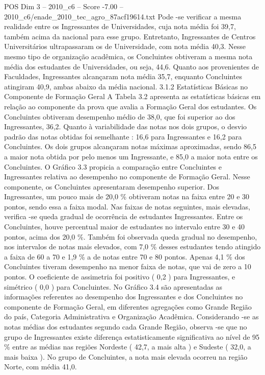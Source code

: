 \begin{textsample}{POS Dim 3 – 2010\_c6 – Score -7.00 – 2010\_c6/enade\_2010\_tec\_agro\_87acf19614.txt}
Pode -se verificar a mesma realidade entre os Ingressantes de Universidades, cuja nota média foi 39,7, também acima da nacional para esse grupo.
Entretanto, Ingressantes de Centros Universitários ultrapassaram os de Universidade, com nota média 40,3.
Nesse mesmo tipo de organização acadêmica, os Concluintes obtiveram a mesma nota média dos estudantes de Universidades, ou seja, 44,6.
Quanto aos provenientes de Faculdades, Ingressantes alcançaram nota média 35,7, enquanto Concluintes atingiram 40,9, ambas abaixo da média nacional. 3.1.2 Estatísticas Básicas no Componente de Formação Geral A Tabela 3.2 apresenta as estatísticas básicas em relação ao componente da prova que avalia a Formação Geral dos estudantes.
Os Concluintes obtiveram desempenho médio de 38,0, que foi superior ao dos Ingressantes, 36,2.
Quanto à variabilidade das notas nos dois grupos, o desvio padrão das notas obtidas foi semelhante : 16,6 para Ingressantes e 16,2 para Concluintes.
Os dois grupos alcançaram notas máximas aproximadas, sendo 86,5 a maior nota obtida por pelo menos um Ingressante, e 85,0 a maior nota entre os Concluintes.
O Gráfico 3.3 propicia a comparação entre Concluintes e Ingressantes relativa ao desempenho no componente de Formação Geral.
Nesse componente, os Concluintes apresentaram desempenho superior.
Dos Ingressantes, um pouco mais de 20,0 \% obtiveram notas na faixa entre 20 e 30 pontos, sendo essa a faixa modal.
Nas faixas de notas seguintes, mais elevadas, verifica -se queda gradual de ocorrência de estudantes Ingressantes.
Entre os Concluintes, houve percentual maior de estudantes no intervalo entre 30 e 40 pontos, acima dos 20,0 \%.
Também foi observada queda gradual no desempenho, nos intervalos de notas mais elevados, com 7,0 \% desses estudantes tendo atingido a faixa de 60 a 70 e 1,9 \% a de notas entre 70 e 80 pontos.
Apenas 4,1 \% dos Concluintes tiveram desempenho na menor faixa de notas, que vai de zero a 10 pontos.
O coeficiente de assimetria foi positivo ( 0,2 ) para Ingressantes, e simétrico ( 0,0 ) para Concluintes.
No Gráfico 3.4 são apresentadas as informações referentes ao desempenho dos Ingressantes e dos Concluintes no componente de Formação Geral, em diferentes agregações como Grande Região do país, Categoria Administrativa e Organização Acadêmica.
Considerando -se as notas médias dos estudantes segundo cada Grande Região, observa -se que no grupo de Ingressantes existe diferença estatisticamente significativa ao nível de 95 \% entre as médias nas regiões Nordeste ( 42,7, a mais alta ) e Sudeste ( 32,0, a mais baixa ).
No grupo de Concluintes, a nota mais elevada ocorreu na região Norte, com média 41,0.

\end{textsample}
